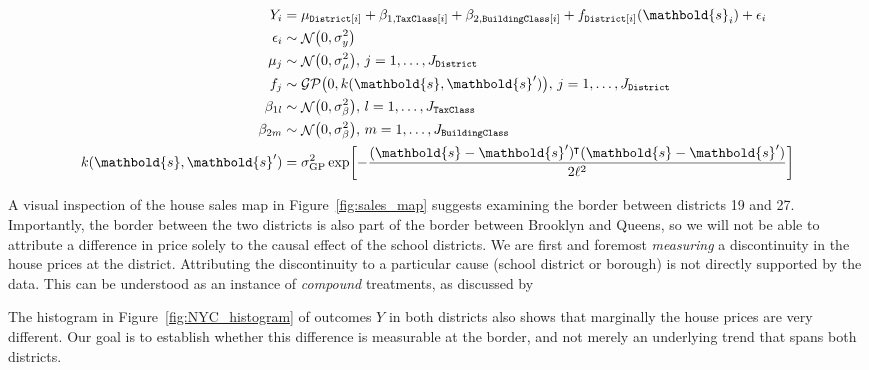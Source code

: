 \documentclass[letter]{article}
\DeclarePairedDelimiter{\parenthesis}{\lparen}{\rparen}
\DeclarePairedDelimiter{\squarebracket}{\lbrack}{\rbrack}
\DeclarePairedDelimiter{\curlybracket}{\lbrack}{\rbrack}
\newcommand{\del}[1]{\parenthesis*{#1}}
\newcommand{\sbr}[1]{\squarebracket*{#1}}
\newcommand{\cbr}[1]{\curlybracket*{#1}}
\DeclareMathOperator{\normal}{\mathcal{N}}
\newcommand{\saleprice}{\mathtt{SalePrice}}
\newcommand{\sqft}{\mathtt{SQFT}}
\newcommand{\tax}{\mathtt{TaxClass}}
\newcommand{\building}{\mathtt{BuildingClass}}
\newcommand{\district}{\mathtt{District}}
\newcommand{\gp}{\mathcal{GP}}
\newcommand*{\trans}{^{\mkern-1.5mu\intercal}}
\newcommand{\sigmaf}{\sigma_{\mathrm{GP}}}
\newcommand{\sigmamu}{\sigma_{\mu}}
\newcommand{\svec}{\mathbold{s}}
\renewcommand{\cite}[1]{\citet{#1}}
\begin{document}
\begin{equation}
\begin{split}
    Y_i &= %
             \mu_{\district\sbr{i}} + \beta_{1,\tax\sbr{i}} + \beta_{2,\building\sbr{i}}
                  + f_{\district\sbr{i}}(\svec_i) + \epsilon_i
    \\
    \epsilon_i &\sim \normal\del{0, \sigma_y^2} \\
    \mu_{j} &\sim \normal\del{0, \sigmamu^2},\,j=1,\dotsc,J_\district \\
    f_j &\sim \gp\del{0, k(\svec, \svec')},\,j=1,\dotsc,J_\district \\
    \beta_{1l} &\sim \normal\del{0, \sigma_\beta^2},\,l=1,\dotsc,J_\tax \\
    \beta_{2m} &\sim \normal\del{0, \sigma_\beta^2},\,m=1,\dotsc,J_\building \\
    k(\svec, \svec') &= \sigmaf^2 \exp\cbr{ - \frac{(\svec-\svec')\trans(\svec-\svec')}{2\ell^2}}
\end{split}
\end{equation}

A visual inspection of the house sales map in Figure~\ref{fig:sales_map} suggests examining the border between districts 19 and 27.
Importantly, the border between the two districts is also part of the border between Brooklyn and Queens, so we will not be able to attribute a difference in price solely to the causal effect of the school districts.
We are first and foremost \emph{measuring} a discontinuity in the house prices at the district. Attributing the discontinuity to a particular cause (school district or borough) is not directly supported by the data.
This can be understood as an instance of \emph{compound} treatments, as discussed by \cite{keele_titiunik_2015}

The histogram in Figure~\ref{fig:NYC_histogram} of outcomes \(Y\) in both districts also shows that marginally the house prices are very different.
Our goal is to establish whether this difference is measurable at the border, and not merely an underlying trend that spans both districts.
\end{document}
